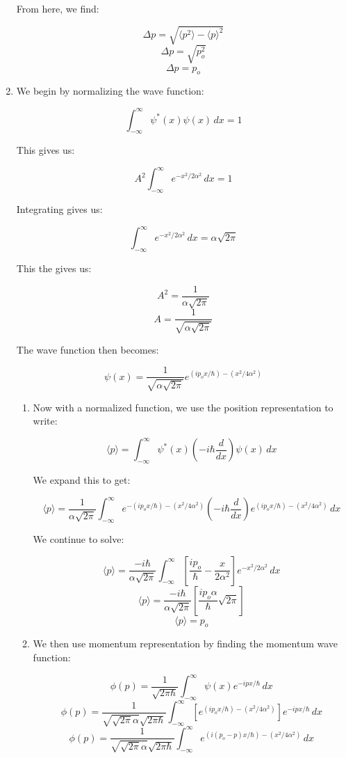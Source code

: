\begin{enumerate}
    From here, we find:

    $$\Delta p=\sqrt{\langle p^2\rangle -\langle p\rangle^2}$$
    $$\Delta p=\sqrt{p_o^2}$$
    $$\boxed{\Delta p=p_o}$$

  \item We begin by normalizing the wave function:

    $$\int_{-\infty}^{\infty} \psi^*(x)\psi(x)\,dx=1$$

    This gives us:

    $$A^2\int_{-\infty}^{\infty} e^{-x^2/2\alpha^2}\,dx=1$$

    Integrating gives us:

    $$\int_{-\infty}^{\infty} e^{-x^2/2\alpha^2}\,dx=\alpha\sqrt{2\pi}$$

    This the gives us:

    $$A^2=\frac{1}{\alpha\sqrt{2\pi}}$$
    $$\boxed{A=\frac{1}{\sqrt{\alpha\sqrt{2\pi}}}}$$

    The wave function then becomes:

    $$\psi(x)=\frac{1}{\sqrt{\alpha\sqrt{2\pi}}}e^{(ip_ox/\hbar)-(x^2/4\alpha^2)}$$

    \begin{enumerate}

      \item Now with a normalized function, we use the position representation to write:

        $$\langle p\rangle=\int_{-\infty}^{\infty}\psi^*(x)\left( -i\hbar\frac{d}{dx} \right)\psi(x)\,dx$$

        We expand this to get:

        $$\langle p\rangle=\frac{1}{\alpha\sqrt{2\pi}}\int_{-\infty}^{\infty}e^{-(ip_ox/\hbar)-(x^2/4\alpha^2)}\left( -i\hbar\frac{d}{dx} \right)e^{(ip_ox/\hbar)-(x^2/4\alpha^2)}\,dx$$

        We continue to solve:

        $$\langle p\rangle=\frac{-i\hbar}{\alpha\sqrt{2\pi}}\int_{-\infty}^{\infty}\left[ \frac{ip_o}{\hbar}-\frac{x}{2\alpha^2} \right]e^{-x^2/2\alpha^2}\,dx$$
        $$\langle p\rangle=\frac{-i\hbar}{\alpha\sqrt{2\pi}}\left[ \frac{ip_o\alpha}{\hbar}\sqrt{2\pi} \right]$$
        $$\boxed{\langle p\rangle=p_o}$$

      \item We then use momentum representation by finding the momentum wave function:

        $$\phi(p)=\frac{1}{\sqrt{2\pi\hbar}}\int_{-\infty}^{\infty}\psi(x)e^{-ipx/\hbar}\,dx$$
        $$\phi(p)=\frac{1}{\sqrt{\sqrt{2\pi}\alpha}\sqrt{2\pi\hbar}}\int_{-\infty}^{\infty}\left[  e^{(ip_ox/\hbar)-(x^2/4\alpha^2)}\right]e^{-ipx/\hbar}\,dx$$
        $$\phi(p)=\frac{1}{\sqrt{\sqrt{2\pi}\alpha}\sqrt{2\pi\hbar}}\int_{-\infty}^{\infty}e^{(i(p_o-p)x/\hbar)-(x^2/4\alpha^2)}\,dx$$


\end{enumerate}
\end{enumerate}
